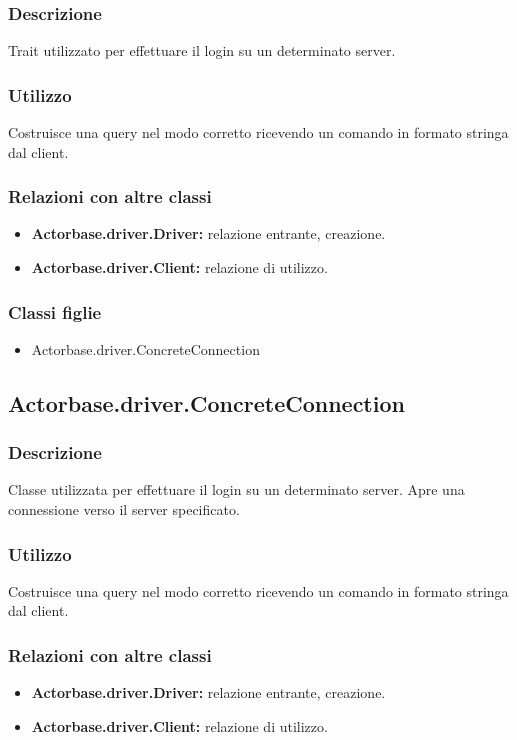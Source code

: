 \documentclass[a4paper]{article}
\begin{document}
			\subsubsection{Descrizione}
				Trait utilizzato per effettuare il login su un determinato server.
				 
			\subsubsection{Utilizzo}
				Costruisce una query nel modo corretto ricevendo un comando in formato stringa dal client.
				
			\subsubsection{Relazioni con altre classi}
				\begin{itemize}
					\item \textbf{Actorbase.driver.Driver:} relazione entrante, creazione.
					\item \textbf{Actorbase.driver.Client:} relazione di utilizzo.
				\end{itemize}
			\subsubsection{Classi figlie}
				\begin{itemize}
					\item Actorbase.driver.ConcreteConnection
				\end{itemize}
				
		\subsection{Actorbase.driver.ConcreteConnection}
			\subsubsection{Descrizione}
				Classe utilizzata per effettuare il login su un determinato server. Apre una connessione verso il server specificato.
				
			\subsubsection{Utilizzo}
				Costruisce una query nel modo corretto ricevendo un comando in formato stringa dal client.
				
			\subsubsection{Relazioni con altre classi}
				\begin{itemize}
					\item \textbf{Actorbase.driver.Driver:} relazione entrante, creazione.
					\item \textbf{Actorbase.driver.Client:} relazione di utilizzo.
				\end{itemize}
\end{document}
